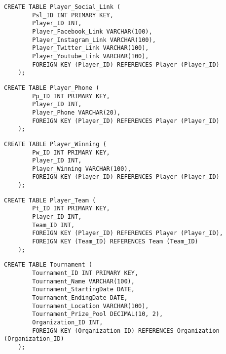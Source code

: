     \begin{lstlisting}[caption={Create Player Social Link table}, label={lst:create_player_social_link}]
    CREATE TABLE Player_Social_Link (
        Psl_ID INT PRIMARY KEY,
        Player_ID INT,
        Player_Facebook_Link VARCHAR(100),
        Player_Instagram_Link VARCHAR(100),
        Player_Twitter_Link VARCHAR(100),
        Player_Youtube_Link VARCHAR(100),
        FOREIGN KEY (Player_ID) REFERENCES Player (Player_ID)
    );
    \end{lstlisting}
    
    \begin{lstlisting}[caption={Create Player Phone table}, label={lst:create_player_phone}]
    CREATE TABLE Player_Phone (
        Pp_ID INT PRIMARY KEY,
        Player_ID INT,
        Player_Phone VARCHAR(20),
        FOREIGN KEY (Player_ID) REFERENCES Player (Player_ID)
    );
    \end{lstlisting}
    \clearpage
    \begin{lstlisting}[caption={Create Player Winning table}, label={lst:create_player_winning}]
    CREATE TABLE Player_Winning (
        Pw_ID INT PRIMARY KEY,
        Player_ID INT,
        Player_Winning VARCHAR(100),
        FOREIGN KEY (Player_ID) REFERENCES Player (Player_ID)
    );
    \end{lstlisting}
    
    \begin{lstlisting}[caption={Create Player Team table}, label={lst:create_player_team}]
    CREATE TABLE Player_Team (
        Pt_ID INT PRIMARY KEY,
        Player_ID INT,
        Team_ID INT,
        FOREIGN KEY (Player_ID) REFERENCES Player (Player_ID),
        FOREIGN KEY (Team_ID) REFERENCES Team (Team_ID)
    );
    \end{lstlisting}
    
    \begin{lstlisting}[caption={Create Tournament table}, label={lst:create_tournament}]
    CREATE TABLE Tournament (
        Tournament_ID INT PRIMARY KEY,
        Tournament_Name VARCHAR(100),
        Tournament_StartingDate DATE,
        Tournament_EndingDate DATE,
        Tournament_Location VARCHAR(100),
        Tournament_Prize_Pool DECIMAL(10, 2),
        Organization_ID INT,
        FOREIGN KEY (Organization_ID) REFERENCES Organization (Organization_ID)
    );
    \end{lstlisting}
  

